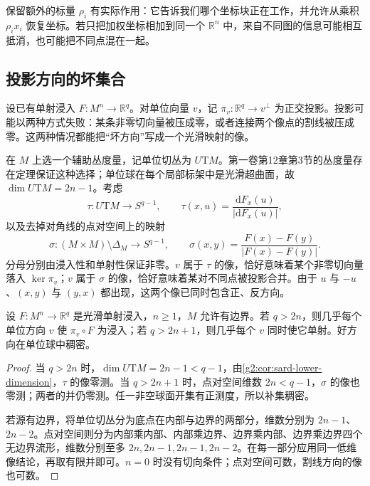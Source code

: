 保留额外的标量 \(\rho_i\) 有实际作用：它告诉我们哪个坐标块正在工作，并允许从乘积 \(\rho_i x_i\) 恢复坐标。若只把加权坐标相加到同一个 \(\mathbb R^n\) 中，来自不同图的信息可能相互抵消，也可能把不同点混在一起。

\subsection{投影方向的坏集合}
\label{g2:subsec:1501:02}

设已有单射浸入 \(F:M^n\to\mathbb R^q\)。对单位向量 \(v\)，记 \(\pi_v:\mathbb R^q\to v^\perp\) 为正交投影。投影可能以两种方式失败：某条非零切向量被压成零，或者连接两个像点的割线被压成零。这两种情况都能把“坏方向”写成一个光滑映射的像。

\ProseParagraphBreak

在 \(M\) 上选一个辅助丛度量，记单位切丛为 \(U\mathrm{T}M\)。第一卷第12章第3节的丛度量存在定理保证这种选择；单位球在每个局部标架中是光滑超曲面，故 \(\dim U\mathrm{T}M=2n-1\)。考虑
\[
	\tau:U\mathrm{T}M\longrightarrow S^{q-1},\qquad
	\tau(x,u)=\frac{\mathrm{d}F_x(u)}{|\mathrm{d}F_x(u)|},
\]
以及去掉对角线的点对空间上的映射
\[
	\sigma:(M\times M)\setminus\Delta_M\longrightarrow S^{q-1},\qquad
	\sigma(x,y)=\frac{F(x)-F(y)}{|F(x)-F(y)|}.
\]
分母分别由浸入性和单射性保证非零。\(v\) 属于 \(\tau\) 的像，恰好意味着某个非零切向量落入 \(\ker\pi_v\)；\(v\) 属于 \(\sigma\) 的像，恰好意味着某对不同点被投影合并。由于 \(u\) 与 \(-u\)、\((x,y)\) 与 \((y,x)\) 都出现，这两个像已同时包含正、反方向。

\begin{proposition}\label{g2:prop:good-projection-directions}
	设 \(F:M^n\to\mathbb R^q\) 是光滑单射浸入，\(n\ge1\)，\(M\) 允许有边界。若 \(q>2n\)，则几乎每个单位方向 \(v\) 使 \(\pi_v\circ F\) 为浸入；若 \(q>2n+1\)，则几乎每个 \(v\) 同时使它单射。好方向在单位球中稠密。
\end{proposition}
\begin{proof}
	当 \(q>2n\) 时，\(\dim U\mathrm{T}M=2n-1<q-1\)，由\cref{g2:cor:sard-lower-dimension}，\(\tau\) 的像零测。当 \(q>2n+1\) 时，点对空间维数 \(2n<q-1\)，\(\sigma\) 的像也零测；两者的并仍零测。任一非空球面开集有正测度，所以补集稠密。

	若源有边界，将单位切丛分为底点在内部与边界的两部分，维数分别为 \(2n-1\)、\(2n-2\)。点对空间则分为内部乘内部、内部乘边界、边界乘内部、边界乘边界四个无边界流形，维数分别至多 \(2n,2n-1,2n-1,2n-2\)。在每一部分应用同一低维像结论，再取有限并即可。\(n=0\) 时没有切向条件；点对空间可数，割线方向的像也可数。
\end{proof}

